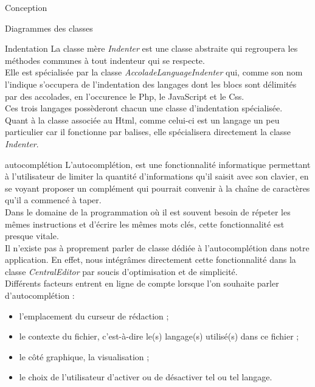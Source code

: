 \documentclass[a4paper, 12pt]{report}
\begin{document}
\begin{part}{Conception}
\begin{chapter}{Diagrammes des classes}
\begin{section}{Indentation}
				La classe mère \emph{Indenter} est une classe abstraite qui regroupera les méthodes communes à tout indenteur qui se respecte.\\
				Elle est spécialisée par la classe \emph{AccoladeLanguageIndenter} qui, comme son nom l'indique s'occupera de l'indentation des
				langages dont les blocs sont délimités par des accolades, en l'occurence le \gls{Php}, le \gls{JavaScript} et le \gls{Css}.\\
				Ces trois langages possèderont chacun une classe d'indentation spécialisée.\\

				Quant à la classe associée au \gls{Html}, comme celui-ci est un langage un peu particulier car il fonctionne par balises, elle
				spécialisera directement la classe \emph{Indenter}.
			\end{section}
			\begin{section}{\Gls{autocomplétion}}
				L'autocomplétion, est une fonctionnalité informatique permettant à l'utilisateur de limiter la quantité d'informations qu'il
				saisit avec son clavier, en se voyant proposer un complément qui pourrait convenir à la chaîne de caractères qu'il a
				commencé à taper.\\
				Dans le	domaine de la programmation où il est souvent besoin de répeter les mêmes instructions et d'écrire les mêmes mots clés,
				cette fonctionnalité est presque vitale.\\


				Il n'existe pas à proprement parler de classe dédiée à l'\gls{autocomplétion} dans notre application.
				En effet, nous intégrâmes directement cette fonctionnalité dans la classe \emph{CentralEditor} par soucis d'optimisation
				et de simplicité.\\

				Différents facteurs entrent en ligne de compte lorsque l'on souhaite parler d'\gls{autocomplétion} :
				\begin{itemize}
					\item l'emplacement du curseur de rédaction ;
					\item le contexte du fichier, c'est-à-dire le(s) langage(s) utilisé(s) dans ce fichier ;
					\item le côté graphique, la visualisation ;
					\item le choix de l'utilisateur d'activer ou de désactiver tel ou tel langage.
				\end{itemize}~\\


\end{section}
\end{chapter}
\end{part}
\end{document}
